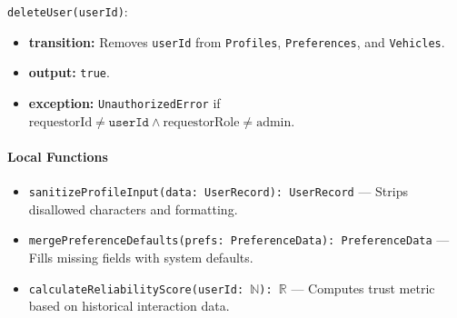 \noindent \texttt{deleteUser(userId)}:
\begin{itemize}
    \item \textbf{transition:} Removes \texttt{userId} from \texttt{Profiles}, \texttt{Preferences}, and \texttt{Vehicles}.
    \item \textbf{output:} \texttt{true}.
    \item \textbf{exception:} \texttt{UnauthorizedError} if $\text{requestorId} \neq \texttt{userId} \land \text{requestorRole} \neq \text{admin}$.
\end{itemize}

\paragraph{Local Functions}
\begin{itemize}
    \item \texttt{sanitizeProfileInput(data: UserRecord): UserRecord} --- Strips disallowed characters and formatting.
    \item \texttt{mergePreferenceDefaults(prefs: PreferenceData): PreferenceData} --- Fills missing fields with system defaults.
    \item \texttt{calculateReliabilityScore(userId: $\mathbb{N}$): $\mathbb{R}$} --- Computes trust metric based on historical interaction data.
\end{itemize}